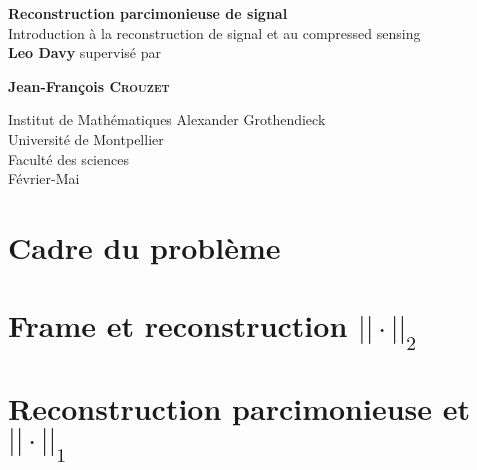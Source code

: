 \documentclass[12pt]{report}
\theoremstyle{plain}
\theoremstyle{remark}
\theoremstyle{definition}
\begin{document}
\renewcommand{\proofname}{Preuve}
\begin{titlepage}
	\begin{center}
		\vspace*{1cm}
		\huge
		\textbf{Reconstruction parcimonieuse de signal\\}
		\vspace*{0.5cm}
	        \LARGE
		Introduction à la reconstruction de signal et au compressed sensing\\ 
		\vspace{1.5cm}
		\textbf{Leo Davy}
		\vfill				      
	        supervisé par\par
		\textbf{Jean-François \textsc{Crouzet}}
							    
		\vspace{0.8cm}
		
		\Large					  
		Institut de Mathématiques Alexander Grothendieck\\
		Université de Montpellier\\
	        Faculté des sciences\\
	        Février-Mai
				      
	\end{center}
\end{titlepage}


\tableofcontents{}

\chapter{Cadre du problème}


\chapter{Frame et reconstruction $||\cdot||_2$}


\chapter{Reconstruction parcimonieuse et $||\cdot||_1$}

\end{document}
